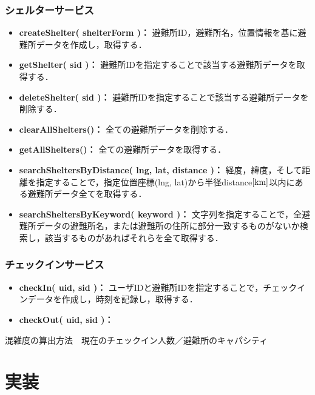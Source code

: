 \documentclass[technicalreport]{ieicej}
\begin{document}
\subsubsection{シェルターサービス}
\begin{itemize}
    \item{\textbf{createShelter( shelterForm )：}
         避難所ID，避難所名，位置情報を基に避難所データを作成し，取得する．}
    \item{\textbf{getShelter( sid )：}
         避難所IDを指定することで該当する避難所データを取得する．}
    \item{\textbf{deleteShelter( sid )：}
         避難所IDを指定することで該当する避難所データを削除する．}
    \item{\textbf{clearAllShelters()：}
         全ての避難所データを削除する．}
    \item{\textbf{getAllShelters()：}
         全ての避難所データを取得する．}
    \item{\textbf{searchSheltersByDistance( lng, lat, distance )：}
         経度，緯度，そして距離を指定することで，指定位置座標(lng, lat)から半径distance$\rm[km]$以内にある避難所データ全てを取得する．}
    \item{\textbf{searchSheltersByKeyword( keyword )：}
         文字列を指定することで，全避難所データの避難所名，または避難所の住所に部分一致するものがないか検索し，該当するものがあればそれらを全て取得する．}
\end{itemize}


\subsubsection{チェックインサービス}
\begin{itemize}
    \item{\textbf{checkIn( uid, sid )：}
         ユーザIDと避難所IDを指定することで，チェックインデータを作成し，時刻を記録し，取得する．}
    \item{\textbf{checkOut( uid, sid )：}
    }
\end{itemize}
混雑度の算出方法　現在のチェックイン人数／避難所のキャパシティ

\section{実装}
\end{document}
